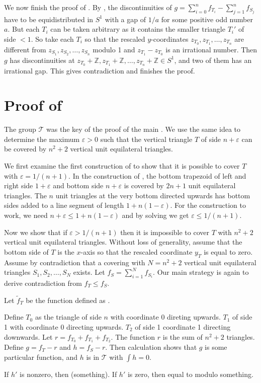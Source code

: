 \documentclass[a4paper]{amsart}
\theoremstyle{plain}
\theoremstyle{definition}
\begin{document}
We now finish the proof of . By , the discontinuities of \(g = \sum_{i=0}^n f_{T_i} - \sum_{j=1}^n f_{S_j}\) have to be equidistributed in \(S^1\) with a gap of \(1/a\) for some positive odd number \(a\).
But each \(T_i\) can be taken arbitrary as it contains the smaller triangle \(T_i'\) of side \(< 1\). So take each \(T_i\) so that the rescaled \(y\)-coordinates \(z_{T_0}, z_{T_1}, \dots, z_{T_n}\) are different from \(z_{S_1}, z_{S_2}, \dots, z_{S_n}\) modulo 1 and \(z_{T_1} - z_{T_0}\) is an irrational number.
Then \(g\) has discontinuities at \(z_{T_0} + \mathbb{Z}, z_{T_1} + \mathbb{Z}, \dots, z_{T_n} + \mathbb{Z} \in S^1\), and two of them has an irrational gap. This gives contradiction and finishes the proof.

\section{Proof of }

The group $\mathcal{T}$ was the key of the proof of the main .
We use the same idea to determine the maximum $\varepsilon > 0$ such that the vertical triangle $T$ of side $n + \varepsilon$ can be covered by $n^2+2$ vertical unit equilateral triangles.

We first examine the first construction of \cite{conway2004coverup, conway2005covering} to show that it is possible to cover $T$ with $\varepsilon = 1/(n+1)$.
In the construction of , the bottom trapezoid of left and right side $1 + \varepsilon$ and bottom side $n + \varepsilon$ is covered by $2n+1$ unit equilateral triangles.
The $n$ unit triangles at the very bottom directed upwards has bottom sides added to a line segment of length $1 + n(1 - \varepsilon)$.
For the construction to work, we need $n + \varepsilon \leq 1 + n(1 - \varepsilon)$ and 
by solving we get $\varepsilon \leq 1/(n+1)$.

Now we show that if $\varepsilon > 1/(n+1)$ then it is impossible to cover $T$ with $n^2+2$ vertical unit equilateral triangles.
Without loss of generality, assume that the bottom side of $T$ is the $x$-axis so that the rescaled coordinate $y_T$ is equal to zero.
Assume by contradiction that a covering with $N = n^2+2$ vertical unit equilateral triangles $S_1, S_2, \dots, S_N$ exists.
Let $f_S = \sum_{i=1}^N f_{S_i}$.
Our main strategy is again to derive contradiction from $f_T \leq f_S$.

Let $\tilde{f}_T$ be the function defined as .

Define $T_0$ as the triangle of side $n$ with coordinate 0 direting upwards. 
$T_1$ of side 1 with coordinate 0 directing upwards.
$T_2$ of side 1 coordinate 1 directing downwards.
Let $r = f_{T_0} + f_{T_1} + f_{T_2}$.
The function $r$ is the sum of $n^2+2$ triangles.
Define $g = f_T - r$ and $h = f_S - r$.
Then calculation shows that $g$ is some particular function,
and $h$ is in $\mathcal{T}$ with $\int h = 0$.

If $h'$ is nonzero, then (something).
If $h'$ is zero, then equal to modulo something.


\printbibliography
\end{document}
